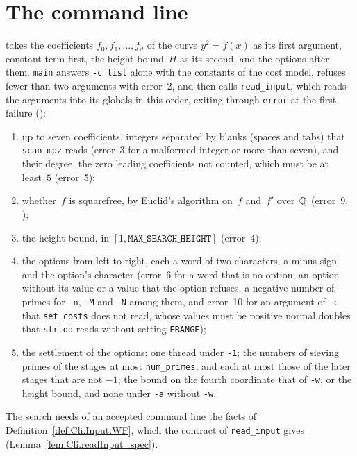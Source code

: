 \section{The command line}\label{sec:input}

\jpoints{} takes the coefficients $f_0, f_1, \dots, f_d$ of the curve $y^2 = f(x)$ as its first
argument, constant term first, the height bound~$H$ as its second, and the options after them.
\texttt{main} answers \texttt{-c list} alone with the constants of the cost model, refuses fewer
than two arguments with error~2, and then calls \texttt{read\_input}, which reads the arguments into
its globals in this order, exiting through \texttt{error} at the first failure
():
\begin{enumerate}
  \item up to seven coefficients, integers separated by blanks (spaces and tabs) that
    \texttt{scan\_mpz} reads (error~3 for a malformed integer or more than seven), and their
    degree, the zero leading coefficients not counted, which must be at least~$5$ (error~5);
  \item whether~$f$ is squarefree, by Euclid's algorithm on~$f$ and~$f'$ over~$\mathbb{Q}$ (error~9,
    );
  \item the height bound, in $[1, \mathtt{MAX\_SEARCH\_HEIGHT}]$ (error~4);
  \item the options from left to right, each a word of two characters, a minus sign and the
    option's character (error~6 for a word that is no option, an option without its value or a
    value that the option refuses, a negative number of primes for \texttt{-n}, \texttt{-M} and
    \texttt{-N} among them, and error~10 for an argument of \texttt{-c} that \texttt{set\_costs}
    does not read, whose values must be positive normal doubles that \texttt{strtod} reads without
    setting \texttt{ERANGE});
  \item the settlement of the options: one thread under \texttt{-1}; the numbers of sieving primes
    of the stages at most \texttt{num\_primes}, and each at most those of the later stages that are
    not $-1$; the bound on the fourth coordinate that of \texttt{-w}, or the height bound, and none
    under \texttt{-a} without \texttt{-w}.
\end{enumerate}
The search needs of an accepted command line the facts of Definition~\ref{def:Cli.Input.WF}, which
the contract of \texttt{read\_input} gives (Lemma~\ref{lem:Cli.readInput_spec}).


